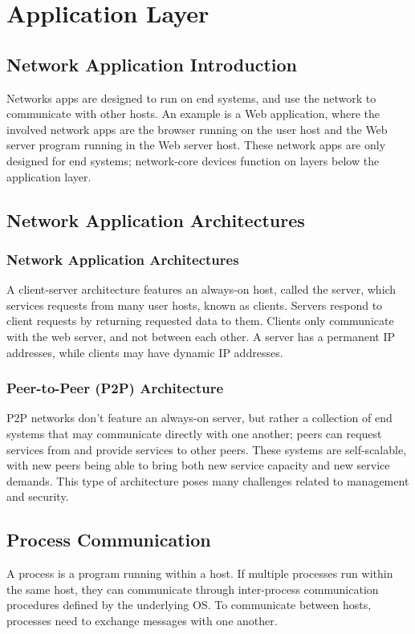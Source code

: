 \documentclass[12pt,titlepage]{article}
\begin{document}
  \section{Application Layer}
    \subsection{Network Application Introduction}
      Networks apps are designed to run on end systems, and use the network to communicate with other hosts. An example is a Web application, where the involved network
      apps are the browser running on the user host and the Web server program running in the Web server host. These network apps are only designed for end systems;
      network-core devices function on layers below the application layer.

    \subsection{Network Application Architectures}
      \subsubsection{Network Application Architectures}
        A client-server architecture features an always-on host, called the server, which services requests from many user hosts, known as clients. Servers respond to
        client requests by returning requested data to them. Clients only communicate with the web server, and not between each other. A server has a permanent IP addresses,
        while clients may have dynamic IP addresses.

      \subsubsection{Peer-to-Peer (P2P) Architecture}
        P2P networks don't feature an always-on server, but rather a collection of end systems that may communicate directly with one another; peers can request services
        from and provide services to other peers. These systems are self-scalable, with new peers being able to bring both new service capacity and new service demands. This
        type of architecture poses many challenges related to management and security.

    \subsection{Process Communication}
      A process is a program running within a host. If multiple processes run within the same host, they can communicate through inter-process communication procedures defined
      by the underlying OS. To communicate between hosts, processes need to exchange messages with one another.
\end{document}
